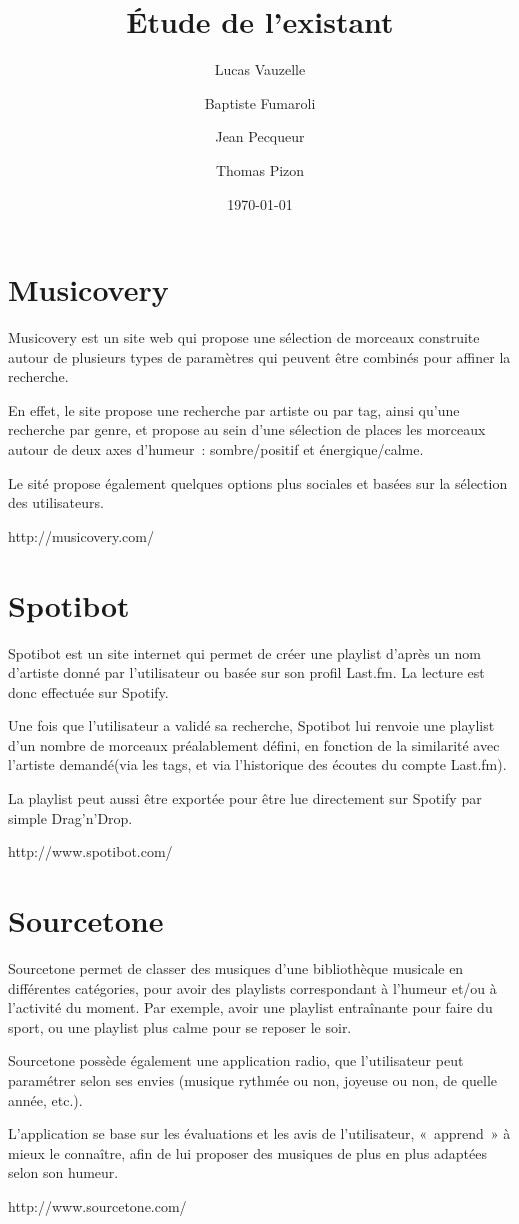 \documentclass{article}
\title{Étude de l'existant}
\author{Lucas Vauzelle \and Baptiste Fumaroli \and Jean Pecqueur \and Thomas Pizon}
\date{\today}
\begin{document}
\maketitle

\section{Musicovery}
Musicovery est un site web qui propose une sélection de morceaux construite
autour de plusieurs types de paramètres qui peuvent être combinés pour affiner
la recherche.

En effet, le site propose une recherche par artiste ou par tag, ainsi qu'une
recherche par genre, et propose au sein d'une sélection de places les morceaux
autour de deux axes d'humeur~: sombre/positif et énergique/calme.

Le sité propose également quelques options plus sociales et basées sur la
sélection des utilisateurs.

http://musicovery.com/

\section{Spotibot}
Spotibot est un site internet qui permet de créer une playlist d'après un nom
d'artiste donné par l'utilisateur ou basée sur son profil Last.fm. La lecture
est donc effectuée sur Spotify.

Une fois que l'utilisateur a validé sa recherche, Spotibot lui renvoie une
playlist d'un nombre de morceaux préalablement défini, en fonction de la
similarité avec l'artiste demandé(via les tags, et via l'historique des écoutes
du compte Last.fm).

La playlist peut aussi être exportée pour être lue directement sur Spotify par
simple Drag'n'Drop.

http://www.spotibot.com/

\section{Sourcetone}
Sourcetone permet de classer des musiques d'une bibliothèque musicale en
différentes catégories, pour avoir des playlists correspondant à l'humeur et/ou
à l'activité du moment. Par exemple, avoir une playlist entraînante pour faire
du sport, ou une playlist plus calme pour se reposer le soir.

Sourcetone possède également une application radio, que l'utilisateur peut
paramétrer selon ses envies (musique rythmée ou non, joyeuse ou non, de quelle
année, etc.).

L'application se base sur les évaluations et les avis de l'utilisateur,
«~apprend~» à mieux le connaître, afin de lui proposer des musiques de plus en
plus adaptées selon son humeur.

http://www.sourcetone.com/
\end{document}
